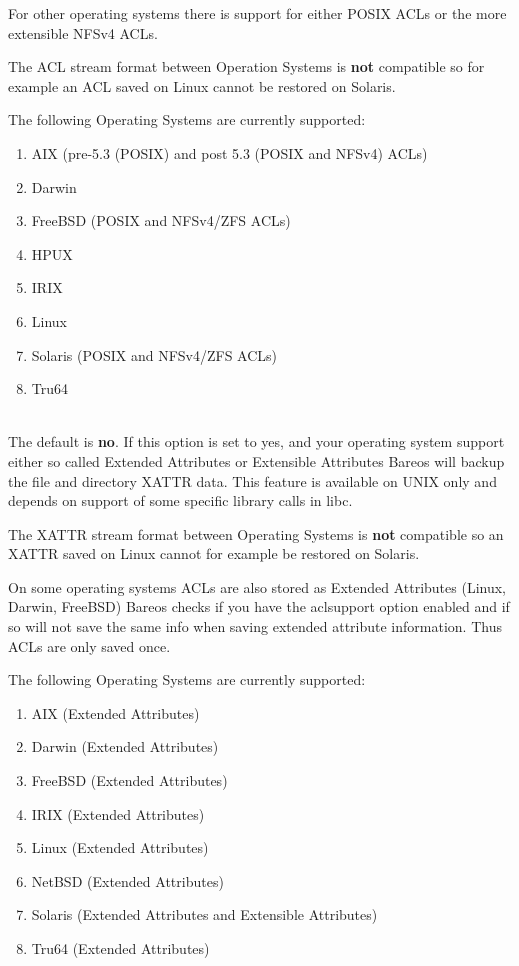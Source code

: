 \begin{description}
   For other operating systems there is support for either POSIX ACLs or
   the more extensible NFSv4 ACLs.

   The ACL stream format between Operation Systems is \textbf{not}
   compatible so for example an ACL saved on Linux cannot be restored on
   Solaris.

   The following Operating Systems are currently supported:

   \begin{enumerate}
   \item AIX (pre-5.3 (POSIX) and post 5.3 (POSIX and NFSv4) ACLs)
   \item Darwin
   \item FreeBSD (POSIX and NFSv4/ZFS ACLs)
   \item HPUX
   \item IRIX
   \item Linux
   \item Solaris (POSIX and NFSv4/ZFS ACLs)
   \item Tru64
   \end{enumerate}

\label{XattrSupport}
\item [xattrsupport=yes{\textbar}no] \hfill \\
   The default is {\bf no}.  If this option is set to yes, and your
   operating system support either so called Extended Attributes or
   Extensible Attributes Bareos will backup the file and directory
   XATTR data. This feature is available on UNIX only and depends on
   support of some specific library calls in libc.

   The XATTR stream format between Operating Systems is {\bf not}
   compatible so an XATTR saved on Linux cannot for example be restored
   on Solaris.

   On some operating systems ACLs are also stored as Extended Attributes
   (Linux, Darwin, FreeBSD) Bareos checks if you have the aclsupport
   option enabled and if so will not save the same info when saving
   extended attribute information. Thus ACLs are only saved once.

   The following Operating Systems are currently supported:

   \begin{enumerate}
   \item AIX (Extended Attributes)
   \item Darwin (Extended Attributes)
   \item FreeBSD (Extended Attributes)
   \item IRIX (Extended Attributes)
   \item Linux (Extended Attributes)
   \item NetBSD (Extended Attributes)
   \item Solaris (Extended Attributes and Extensible Attributes)
   \item Tru64 (Extended Attributes)
   \end{enumerate}


\end{description}

